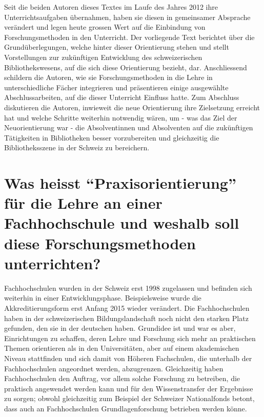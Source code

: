\documentclass[a4paper,
fontsize=11pt,
oneside,
numbers=noperiodatend,
parskip=half-,
bibliography=totoc,
final
]{scrartcl}
\begin{document}
Seit die beiden Autoren dieses Textes im Laufe des Jahres 2012 ihre
Unterrichtsaufgaben übernahmen, haben sie diesen in gemeinsamer
Absprache verändert und legen heute grossen Wert auf die Einbindung von
Forschungsmethoden in den Unterricht. Der vorliegende Text berichtet
über die Grundüberlegungen, welche hinter dieser Orientierung stehen und
stellt Vorstellungen zur zukünftigen Entwicklung des schweizerischen
Bibliothekswesens, auf die sich diese Orientierung bezieht, dar.
Anschliessend schildern die Autoren, wie sie Forschungsmethoden in die
Lehre in unterschiedliche Fächer integrieren und präsentieren einige
ausgewählte Abschlussarbeiten, auf die dieser Unterricht Einfluss hatte.
Zum Abschluss diskutieren die Autoren, inwieweit die neue Orientierung
ihre Zielsetzung erreicht hat und welche Schritte weiterhin notwendig
wären, um - was das Ziel der Neuorientierung war - die Absolventinnen
und Absolventen auf die zukünftigen Tätigkeiten in Bibliotheken besser
vorzubereiten und gleichzeitig die Bibliotheksszene in der Schweiz zu
bereichern.

\section*{Was heisst \enquote{Praxisorientierung} für die Lehre an
einer Fachhochschule und weshalb soll diese Forschungsmethoden
unterrichten?}\label{was-heisst-praxisorientierung-fuxfcr-die-lehre-an-einer-fachhochschule-und-weshalb-soll-diese-forschungsmethoden-unterrichten}

Fachhochschulen wurden in der Schweiz erst 1998 zugelassen und befinden
sich weiterhin in einer Entwicklungsphase. Beispielsweise wurde die
Akkreditierungsform erst Anfang 2015 wieder verändert. Die
Fachhochschulen haben in der schweizerischen Bildungslandschaft noch
nicht den starken Platz gefunden, den sie in der deutschen haben.
Grundidee ist und war es aber, Einrichtungen zu schaffen, deren Lehre
und Forschung sich mehr an praktischen Themen orientieren als in den
Universitäten, aber auf einem akademischen Niveau stattfinden und sich
damit von Höheren Fachschulen, die unterhalb der Fachhochschulen
angeordnet werden, abzugrenzen. Gleichzeitig haben Fachhochschulen den
Auftrag, vor allem solche Forschung zu betreiben, die praktisch
angewendet werden kann und für den Wissenstransfer der Ergebnisse zu
sorgen; obwohl gleichzeitig zum Beispiel der Schweizer Nationalfonds
betont, dass auch an Fachhochschulen Grundlagenforschung betrieben
werden könne.
\end{document}

